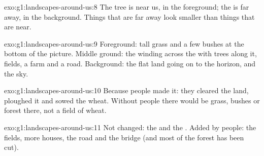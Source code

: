 \begin{solution}{exo:g1:landscapes-around-us:8}
The tree is near us, in the foreground; the  is far away, in the
background. Things that are far away look smaller than things that are
near.
\end{solution}

\begin{solution}{exo:g1:landscapes-around-us:9}
Foreground: tall grass and a few bushes at the bottom of the picture.
Middle ground: the  winding across the  with trees along it,
fields, a farm and a road.
Background: the flat land going on to the horizon, and the sky.
\end{solution}

\begin{solution}{exo:g1:landscapes-around-us:10}
Because people made it: they cleared the land, ploughed it and sowed the
wheat. Without people there would be grass, bushes or forest there, not a
field of wheat.
\end{solution}

\begin{solution}{exo:g1:landscapes-around-us:11}
Not changed: the  and the . Added by people: the fields, more
houses, the road and the bridge (and most of the forest has been cut).
\end{solution}
